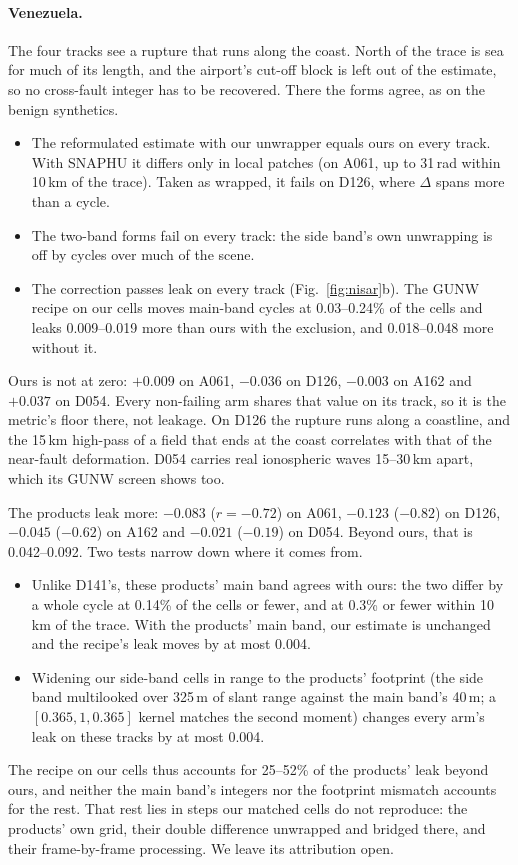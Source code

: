 \paragraph{Venezuela.} The four tracks see a rupture that runs along the coast. North of the trace is sea for much
of its length, and the airport's cut-off block is left out of the estimate, so no cross-fault integer has to be
recovered. There the forms agree, as on the benign synthetics.
\begin{itemize}
  \item The reformulated estimate with our unwrapper equals ours on every track. With SNAPHU it differs only in local
        patches (on A061, up to 31\,rad within 10\,km of the trace). Taken as wrapped, it fails on D126, where $\Delta$
        spans more than a cycle.
  \item The two-band forms fail on every track: the side band's own unwrapping is off by cycles over much of the scene.
  \item The correction passes leak on every track (Fig.~\ref{fig:nisar}b). The GUNW recipe on our cells moves
        main-band cycles at 0.03--0.24\% of the cells and leaks 0.009--0.019 more than ours with the exclusion, and
        0.018--0.048 more without it.
\end{itemize}
Ours is not at zero: $+0.009$ on A061, $-0.036$ on D126, $-0.003$ on A162 and $+0.037$ on D054. Every non-failing arm
shares that value on its track, so it is the metric's floor there, not leakage. On D126 the rupture runs along a
coastline, and the 15\,km high-pass of a field that ends at the coast correlates with that of the near-fault
deformation. D054 carries real ionospheric waves 15--30\,km apart, which its GUNW screen shows too.

The products leak more: $-0.083$ ($r=-0.72$) on A061, $-0.123$ ($-0.82$) on D126, $-0.045$ ($-0.62$) on A162 and
$-0.021$ ($-0.19$) on D054. Beyond ours, that is 0.042--0.092. Two tests narrow down where it comes from.
\begin{itemize}
  \item Unlike D141's, these products' main band agrees with ours: the two differ by a whole cycle at 0.14\% of the
        cells or fewer, and at 0.3\% or fewer within 10\,km of the trace. With the products' main band, our estimate
        is unchanged and the recipe's leak moves by at most 0.004.
  \item Widening our side-band cells in range to the products' footprint (the side band multilooked over 325\,m of
        slant range against the main band's 40\,m; a $[0.365, 1, 0.365]$ kernel matches the second moment) changes
        every arm's leak on these tracks by at most 0.004.
\end{itemize}
The recipe on our cells thus accounts for 25--52\% of the products' leak beyond ours, and neither the main band's
integers nor the footprint mismatch accounts for the rest. That rest lies in steps our matched cells do not
reproduce: the products' own grid, their double difference unwrapped and bridged there, and their frame-by-frame
processing. We leave its attribution open.

